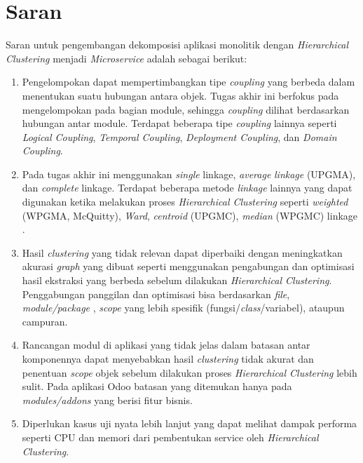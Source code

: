 \section{Saran}
Saran  untuk pengembangan dekomposisi aplikasi monolitik dengan \textit{Hierarchical Clustering} menjadi \textit{Microservice} adalah sebagai berikut:
\begin{enumerate}[nolistsep,leftmargin=0.5cm]
    \item  Pengelompokan dapat  mempertimbangkan tipe  \textit{coupling} yang berbeda dalam menentukan suatu hubungan antara objek. Tugas akhir ini berfokus pada mengelompokan pada bagian module, sehingga \textit{coupling} dilihat berdasarkan hubungan antar module. Terdapat beberapa tipe \textit{coupling} lainnya seperti  \textit{Logical Coupling},  \textit{Temporal Coupling},  \textit{Deployment Coupling}, dan  \textit{Domain Coupling}.
    \item Pada tugas akhir ini menggunakan \textit{single} linkage, \textit{average} \textit{linkage} (UPGMA), dan \textit{complete} linkage.  Terdapat beberapa metode \textit{linkage} lainnya yang dapat digunakan ketika melakukan proses \textit{Hierarchical Clustering} seperti \textit{weighted} (WPGMA, McQuitty), \textit{Ward}, \textit{centroid} (UPGMC),  \textit{median} (WPGMC) linkage \cite{09E}. 
    \item Hasil \textit{clustering} yang tidak relevan dapat diperbaiki dengan meningkatkan akurasi \textit{graph} yang dibuat seperti menggunakan pengabungan dan optimisasi hasil ekstraksi yang berbeda sebelum dilakukan \textit{Hierarchical Clustering}. Penggabungan panggilan dan optimisasi  bisa berdasarkan \textit{file}, \textit{module/package} , \textit{scope} yang lebih spesifik (fungsi/\textit{class}/variabel), ataupun campuran.
    \item Rancangan modul di aplikasi yang tidak jelas dalam batasan antar komponennya dapat menyebabkan hasil \textit{clustering} tidak akurat dan penentuan \textit{scope} objek sebelum dilakukan proses \textit{Hierarchical Clustering} lebih sulit. Pada aplikasi Odoo batasan yang ditemukan hanya pada \textit{modules/addons} yang berisi fitur bisnis.
    \item Diperlukan kasus uji nyata lebih lanjut yang dapat melihat dampak performa seperti CPU dan memori dari pembentukan service oleh  \textit{Hierarchical Clustering}. 
\end{enumerate}

